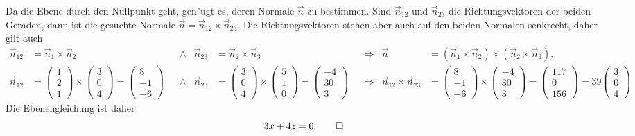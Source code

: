 \begin{loesung}
Da die Ebene durch den Nullpunkt geht, gen"ugt es, deren Normale $\vec n$
zu bestimmen.
Sind
$\vec n_{12}$
und
$\vec n_{23}$
die Richtungsvektoren der beiden Geraden, dann ist die gesuchte Normale
$\vec n=\vec n_{12}\times\vec n_{23}$.
Die Richtungsvektoren stehen aber auch auf den beiden Normalen senkrecht,
daher gilt auch
\begin{align*}
\vec n_{12}
&=
\vec n_1\times\vec n_2
&
&\wedge&
\vec n_{23}
&=
\vec n_2\times\vec n_3
&
&\Rightarrow&
\vec n
&=
(\vec n_1\times\vec n_2)
\times
(\vec n_2\times\vec n_3).
\\
\vec n_{12}&=
\begin{pmatrix}1\\2\\1\end{pmatrix}
\times
\begin{pmatrix}3\\0\\4\end{pmatrix}
=
\begin{pmatrix}8\\-1\\-6\end{pmatrix}
&&\wedge&
\vec n_{23}
&=
\begin{pmatrix}3\\0\\4\end{pmatrix}
\times
\begin{pmatrix}5\\1\\0\end{pmatrix}
=
\begin{pmatrix}-4\\30\\3\end{pmatrix}
&
&\Rightarrow&
\vec n_{12}\times\vec n_{23}
&=
\begin{pmatrix}8\\-1\\-6\end{pmatrix}
\times
\begin{pmatrix}-4\\30\\3\end{pmatrix}
=
\begin{pmatrix}117\\0\\156\end{pmatrix}=39\begin{pmatrix}3\\0\\4\end{pmatrix}
\end{align*}
Die Ebenengleichung ist daher
\[
3x+4z=0.
\qedhere
\]
\end{loesung}

\begin{bewertung}
\end{bewertung}

